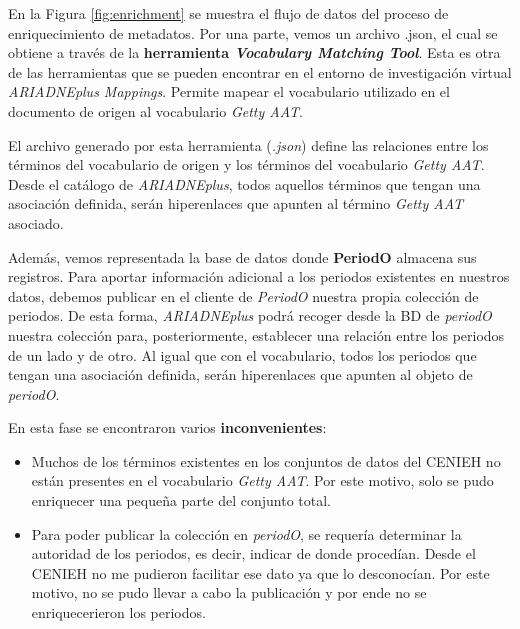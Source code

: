 En la Figura \ref{fig:enrichment} se muestra el flujo de datos del proceso de
enriquecimiento de metadatos. Por una parte, vemos un archivo .json, el
cual se obtiene a través de la \textbf{herramienta \emph{Vocabulary Matching
Tool}}. Esta es otra de las herramientas que se pueden encontrar en el
entorno de investigación virtual \emph{ARIADNEplus Mappings}. Permite mapear el vocabulario utilizado
en el documento de origen al vocabulario \emph{Getty AAT}.


El archivo generado por esta herramienta (\emph{.json}) define las relaciones
entre los términos del vocabulario de origen y los términos del
vocabulario \emph{Getty AAT}. Desde el catálogo de \emph{ARIADNEplus}, todos
aquellos términos que tengan una asociación definida, serán hiperenlaces
que apunten al término \emph{Getty AAT} asociado.


Además, vemos representada la base de datos donde \textbf{PeriodO} almacena sus
registros. Para aportar información adicional a los periodos existentes
en nuestros datos, debemos publicar en el cliente de \emph{PeriodO} nuestra
propia colección de periodos. De esta forma, \emph{ARIADNEplus} podrá recoger
desde la BD de \emph{periodO} nuestra colección para, posteriormente,
establecer una relación entre los periodos de un lado y de otro. Al
igual que con el vocabulario, todos los periodos que tengan una
asociación definida, serán hiperenlaces que apunten al objeto de
\emph{periodO}.


En esta fase se encontraron varios \textbf{inconvenientes}: 

\begin{itemize}
\tightlist
\item
  Muchos de los términos existentes en los conjuntos de datos del CENIEH no están
  presentes en el vocabulario \emph{Getty AAT}. Por este motivo, solo se
  pudo enriquecer una pequeña parte del conjunto total.
\item
  Para poder publicar la colección en \emph{periodO}, se requería determinar la autoridad de
  los periodos, es decir, indicar de donde procedían. Desde el CENIEH no
  me pudieron facilitar ese dato ya que lo desconocían. Por este motivo,
  no se pudo llevar a cabo la publicación y por ende no se enriquecerieron
  los periodos.
\end{itemize}

